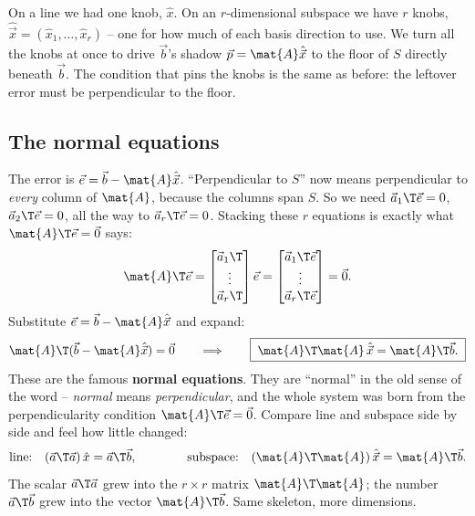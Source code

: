\begin{intuitionbox}
On a line we had one knob, $\hat{x}$. On an $r$-dimensional subspace we have $r$ knobs,
$\hat{\vec{x}}=(\hat{x}_1,\dots,\hat{x}_r)$ -- one for how much of each basis direction to use. We
turn all the knobs at once to drive $\vec{b}$'s shadow $\vec{p}=\mat{A}\hat{\vec{x}}$ to the floor
of $S$ directly beneath $\vec{b}$. The condition that pins the knobs is the same as before: the
leftover error must be perpendicular to the floor.
\end{intuitionbox}

\subsection{The normal equations}

The error is $\vec{e}=\vec{b}-\mat{A}\hat{\vec{x}}$. ``Perpendicular to $S$'' now means
perpendicular to \emph{every} column of $\mat{A}$, because the columns span $S$. So we need
$\vec{a}_1\T\vec{e}=0$, $\vec{a}_2\T\vec{e}=0$, all the way to $\vec{a}_r\T\vec{e}=0$. Stacking
these $r$ equations is exactly what $\mat{A}\T\vec{e}=\vec{0}$ says:
\[
  \mat{A}\T\vec{e}
  = \begin{bmatrix} \vec{a}_1\T \\ \vdots \\ \vec{a}_r\T \end{bmatrix}\vec{e}
  = \begin{bmatrix} \vec{a}_1\T\vec{e} \\ \vdots \\ \vec{a}_r\T\vec{e} \end{bmatrix}
  = \vec{0}.
\]
Substitute $\vec{e}=\vec{b}-\mat{A}\hat{\vec{x}}$ and expand:
\[
  \mat{A}\T(\vec{b}-\mat{A}\hat{\vec{x}}) = \vec{0}
  \qquad\Longrightarrow\qquad
  \boxed{\;\mat{A}\T\mat{A}\,\hat{\vec{x}} = \mat{A}\T\vec{b}.\;}
\]
These are the famous \textbf{normal equations}. They are ``normal'' in the old sense of the word --
\emph{normal} means \emph{perpendicular}, and the whole system was born from the perpendicularity
condition $\mat{A}\T\vec{e}=\vec{0}$. Compare line and subspace side by side and feel how little
changed:
\[
  \text{line:}\quad (\vec{a}\T\vec{a})\,\hat{x} = \vec{a}\T\vec{b},
  \qquad\qquad
  \text{subspace:}\quad (\mat{A}\T\mat{A})\,\hat{\vec{x}} = \mat{A}\T\vec{b}.
\]
The scalar $\vec{a}\T\vec{a}$ grew into the $r\times r$ matrix $\mat{A}\T\mat{A}$; the number
$\vec{a}\T\vec{b}$ grew into the vector $\mat{A}\T\vec{b}$. Same skeleton, more dimensions.

